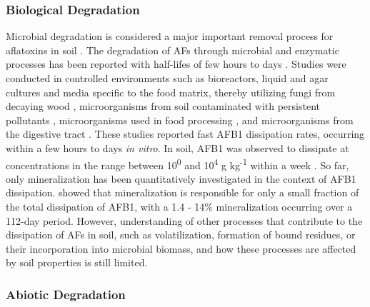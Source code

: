 \subsubsection*{Biological Degradation} 

Microbial degradation is considered a major important removal process for aflatoxins in soil \citep{fouche2020aflatoxins}. The degradation of AFs through microbial and enzymatic processes has been reported with half-lifes of few hours to days \citep{wu2009biological, verheecke2016microbial}. Studies were conducted in controlled environments such as bioreactors, liquid and agar cultures and media specific to the food matrix, thereby utilizing fungi from decaying wood \citep{alberts2009degradation, motomura2003purification}, microorganisms from soil contaminated with persistent pollutants \citep{teniola2005degradation, alberts2006biological}, microorganisms used in food processing \citep{megalla1982detoxification}, and microorganisms from the digestive tract \citep{kiessling1984metabolism, jones1996degradation}. These studies reported fast AFB1 dissipation rates, occurring within a few hours to days \textit{in vitro}. In soil, AFB1 was observed to dissipate at concentrations in the range between 10\textsuperscript{0} and 10\textsuperscript{4} \textmu g kg\textsuperscript{-1} within a week \citep{accinelli2008aspergillus, angle1980decomposition, angle1986aflatoxin}. So far, only mineralization has been quantitatively investigated in the context of AFB1 dissipation. \citet{angle1986aflatoxin} showed that mineralization is responsible for only a small fraction of the total dissipation of AFB1, with a 1.4 - 14\% mineralization occurring over a 112-day period. However, understanding of other processes that contribute to the dissipation of AFs in soil, such as volatilization, formation of bound residues, or their incorporation into microbial biomass, and how these processes are affected by soil properties is still limited.

\subsubsection*{Abiotic Degradation} 

